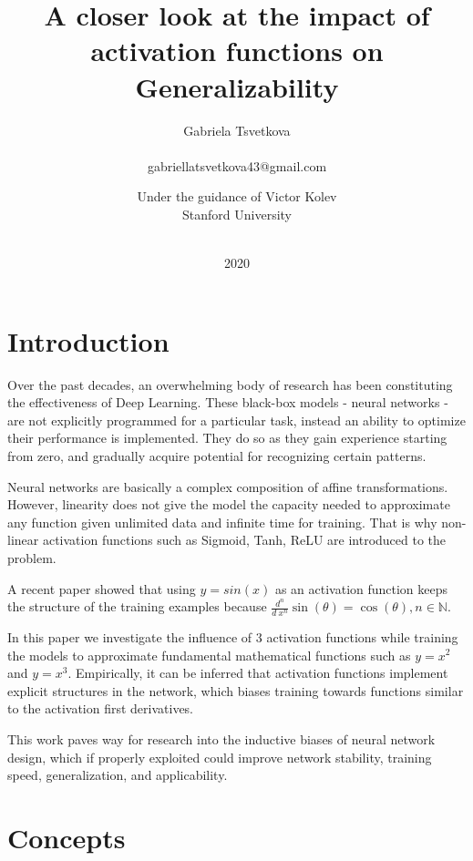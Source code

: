 \documentclass{article}
\title{A closer look at the impact of activation functions on Generalizability}
\author{ Gabriela Tsvetkova
 
 \\ gabriellatsvetkova43@gmail.com \and  Under the guidance of Victor Kolev \\ Stanford University
 }
\date{ \\ 2020}
\begin{document}
\maketitle





\newpage

\renewcommand{\contentsname}{Content}

\tableofcontents

\newpage
\section{Introduction}


Over the past decades, an overwhelming body of research has been constituting the effectiveness of Deep Learning. These black-box models - neural networks - are not explicitly programmed for a particular task, instead an ability to optimize their performance is implemented. They do so as they gain experience starting from zero, and gradually acquire potential for recognizing certain patterns.

Neural networks are basically a complex composition of affine transformations. However, linearity does not give the model the capacity needed to approximate any function given unlimited data and infinite time for training. That is why non-linear activation functions such as Sigmoid, Tanh, ReLU are introduced to the problem. 

A recent paper \cite{SiNU} showed that using $y = sin(x)$ as an activation function keeps the structure of the training examples because $\frac{d^n}{d\ x^n} \sin(\theta) = \cos(\theta) , n \in \mathbb{N} $.

In this paper we investigate the influence of 3 activation functions while training the models to approximate fundamental mathematical functions such as $y = x^2$ and $y = x^3$. Empirically, it can be inferred that activation functions implement explicit structures in the network, which biases training towards functions similar to the activation first derivatives. 

This work paves way for research into the inductive biases of neural network design, which if properly exploited could improve network stability, training speed, generalization, and applicability. 


\section{Concepts}
   \label{Background}
   
\end{document}
